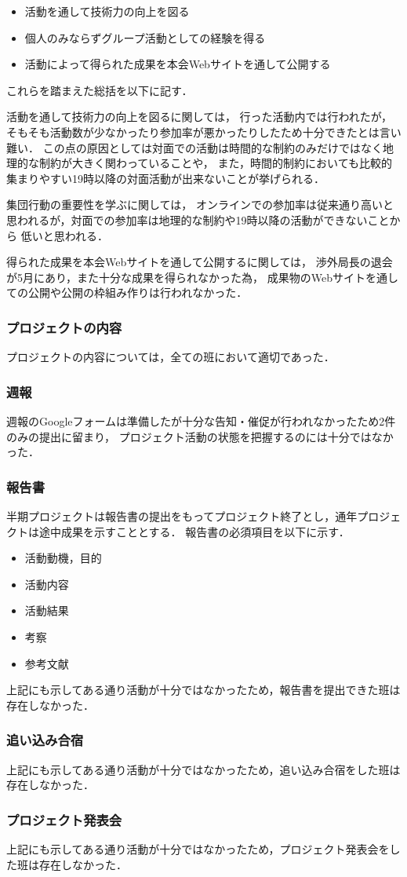 \begin{itemize}
  \item 活動を通して技術力の向上を図る
  \item 個人のみならずグループ活動としての経験を得る
  \item 活動によって得られた成果を本会Webサイトを通して公開する
\end{itemize}

これらを踏まえた総括を以下に記す．

活動を通して技術力の向上を図るに関しては，
行った活動内では行われたが，そもそも活動数が少なかったり参加率が悪かったりしたため十分できたとは言い難い．
この点の原因としては対面での活動は時間的な制約のみだけではなく地理的な制約が大きく関わっていることや，
また，時間的制約においても比較的集まりやすい19時以降の対面活動が出来ないことが挙げられる．

集団行動の重要性を学ぶに関しては，
オンラインでの参加率は従来通り高いと思われるが，対面での参加率は地理的な制約や19時以降の活動ができないことから
低いと思われる．

得られた成果を本会Webサイトを通して公開するに関しては，
渉外局長の退会が5月にあり，また十分な成果を得られなかった為，
成果物のWebサイトを通しての公開や公開の枠組み作りは行われなかった．

\subsubsection*{プロジェクトの内容}
プロジェクトの内容については，全ての班において適切であった．

\subsubsection*{週報}
週報のGoogleフォームは準備したが十分な告知・催促が行われなかったため2件のみの提出に留まり，
プロジェクト活動の状態を把握するのには十分ではなかった．

\subsubsection*{報告書}
半期プロジェクトは報告書の提出をもってプロジェクト終了とし，通年プロジェクトは途中成果を示すこととする．
報告書の必須項目を以下に示す．

\begin{itemize}
  \item 活動動機，目的
  \item 活動内容
  \item 活動結果
  \item 考察
  \item 参考文献
\end{itemize}

上記にも示してある通り活動が十分ではなかったため，報告書を提出できた班は存在しなかった．

\subsubsection*{追い込み合宿}
上記にも示してある通り活動が十分ではなかったため，追い込み合宿をした班は存在しなかった．


\subsubsection*{プロジェクト発表会}
上記にも示してある通り活動が十分ではなかったため，プロジェクト発表会をした班は存在しなかった．

